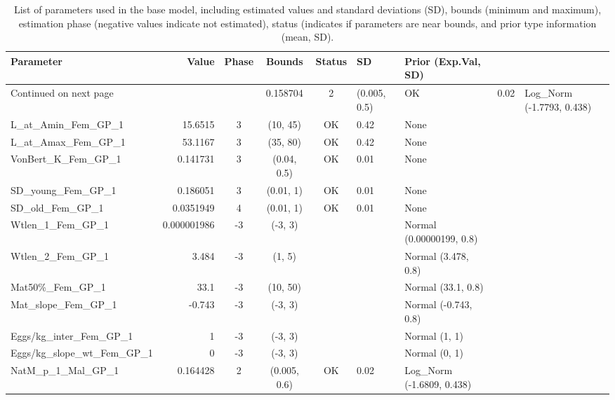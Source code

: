 \documentclass[12pt,]{article}
\begin{document}
\begin{landscape}
\begingroup\fontsize{9pt}{10pt}\selectfont
\begin{longtable}{lrcccll}
\caption{List of parameters used in
                                          the base model, including estimated 
                                          values and standard deviations (SD), 
                                          bounds (minimum and maximum), 
                                          estimation phase (negative values indicate
                                          not estimated), status (indicates if 
                                          parameters are near bounds, and prior type
                                          information (mean, SD).} \\ 
  \hline
Parameter & Value & Phase & Bounds & Status & SD & Prior (Exp.Val, SD)  \\ 
  \hline 
\endhead 
\hline 
\multicolumn{3}{l}{\footnotesize Continued on next page} 
\endfoot 
\endlastfoot 
 \hline
NatM\_p\_1\_Fem\_GP\_1 & 0.158704 & 2 & (0.005, 0.5) & OK & 0.02 & Log\_Norm (-1.7793, 0.438) \\ 
  L\_at\_Amin\_Fem\_GP\_1 & 15.6515 & 3 & (10, 45) & OK & 0.42 & None \\ 
  L\_at\_Amax\_Fem\_GP\_1 & 53.1167 & 3 & (35, 80) & OK & 0.42 & None \\ 
  VonBert\_K\_Fem\_GP\_1 & 0.141731 & 3 & (0.04, 0.5) & OK & 0.01 & None \\ 
  SD\_young\_Fem\_GP\_1 & 0.186051 & 3 & (0.01, 1) & OK & 0.01 & None \\ 
  SD\_old\_Fem\_GP\_1 & 0.0351949 & 4 & (0.01, 1) & OK & 0.01 & None \\ 
  Wtlen\_1\_Fem\_GP\_1 & 0.000001986 & -3 & (-3, 3) &  &  & Normal (0.00000199, 0.8) \\ 
  Wtlen\_2\_Fem\_GP\_1 & 3.484 & -3 & (1, 5) &  &  & Normal (3.478, 0.8) \\ 
  Mat50\%\_Fem\_GP\_1 & 33.1 & -3 & (10, 50) &  &  & Normal (33.1, 0.8) \\ 
  Mat\_slope\_Fem\_GP\_1 & -0.743 & -3 & (-3, 3) &  &  & Normal (-0.743, 0.8) \\ 
  Eggs/kg\_inter\_Fem\_GP\_1 & 1 & -3 & (-3, 3) &  &  & Normal (1, 1) \\ 
  Eggs/kg\_slope\_wt\_Fem\_GP\_1 & 0 & -3 & (-3, 3) &  &  & Normal (0, 1) \\ 
  NatM\_p\_1\_Mal\_GP\_1 & 0.164428 & 2 & (0.005, 0.6) & OK & 0.02 & Log\_Norm (-1.6809, 0.438) \\ 

\end{longtable}
\end{landscape}
\end{document}
